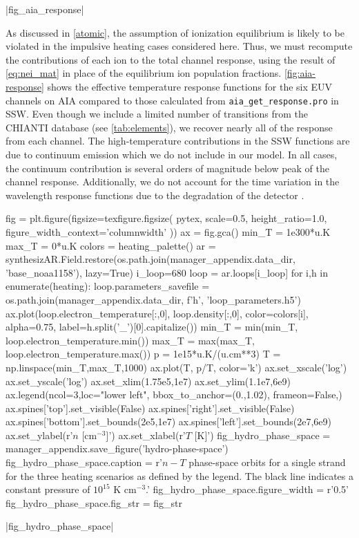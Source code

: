 |fig_aia_response|

As discussed in \autoref{atomic}, the assumption of ionization equilibrium is likely to be violated in the impulsive heating cases considered here. Thus, we must recompute the contributions of each ion to the total channel response, using the result of \autoref{eq:nei_mat} in place of the equilibrium ion population fractions. \autoref{fig:aia-response} shows the effective temperature response functions for the six EUV channels on AIA compared to those calculated from \texttt{aia\_get\_response.pro} in SSW. Even though we include a limited number of transitions from the CHIANTI database (see \autoref{tab:elements}), we recover nearly all of the response from each channel. The high-temperature contributions in the SSW functions are due to continuum emission which we do not include in our model. In all cases, the continuum contribution is several orders of magnitude below peak of the channel response. Additionally, we do not account for the time variation in the wavelength response functions due to the degradation of the detector \citep[see Section 2.1.6 of ][]{boerner_initial_2012}.

\begin{pycode}
fig = plt.figure(figsize=texfigure.figsize(
    pytex,
    scale=0.5,
    height_ratio=1.0, 
    figure_width_context='columnwidth'
))
ax = fig.gca()
min_T = 1e300*u.K
max_T = 0*u.K
colors = heating_palette()
ar = synthesizAR.Field.restore(os.path.join(manager_appendix.data_dir, 'base_noaa1158'), lazy=True)
i_loop=680
loop = ar.loops[i_loop]
for i,h in enumerate(heating):
    loop.parameters_savefile = os.path.join(manager_appendix.data_dir, f'{h}', 'loop_parameters.h5')
    ax.plot(loop.electron_temperature[:,0], loop.density[:,0], color=colors[i], alpha=0.75,
            label=h.split('_')[0].capitalize())
    min_T = min(min_T, loop.electron_temperature.min())
    max_T = max(max_T, loop.electron_temperature.max())
p = 1e15*u.K/(u.cm**3)
T = np.linspace(min_T,max_T,1000)
ax.plot(T, p/T, color='k')
ax.set_xscale('log')
ax.set_yscale('log')
ax.set_xlim(1.75e5,1e7)
ax.set_ylim(1.1e7,6e9)
ax.legend(ncol=3,loc="lower left", bbox_to_anchor=(0.,1.02), frameon=False,)
ax.spines['top'].set_visible(False)
ax.spines['right'].set_visible(False)
ax.spines['bottom'].set_bounds(2e5,1e7)
ax.spines['left'].set_bounds(2e7,6e9)
ax.set_ylabel(r'$n$ [cm$^{-3}$]')
ax.set_xlabel(r'$T$ [K]')
fig_hydro_phase_space = manager_appendix.save_figure('hydro-phase-space')
fig_hydro_phase_space.caption = r'$n-T$ phase-space orbits for a single strand for the three heating scenarios as defined by the legend. The black line indicates a constant pressure of $10^{15}$ K cm$^{-3}$.'
fig_hydro_phase_space.figure_width = r'0.5\columnwidth'
fig_hydro_phase_space.fig_str = fig_str
\end{pycode}
|fig_hydro_phase_space|

